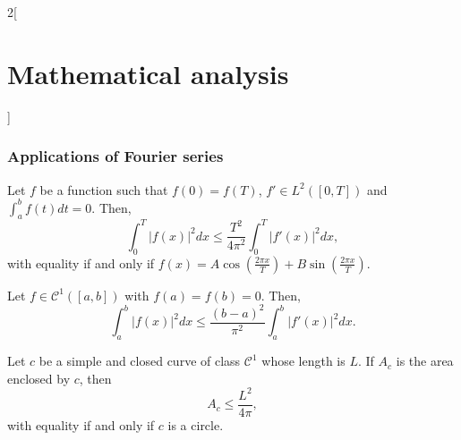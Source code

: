 \documentclass[class=article,crop=false]{standalone}
\begin{document}
\begin{multicols}{2}[\section{Mathematical analysis}]
\subsubsection{Applications of Fourier series}
\begin{theorem}
Let $f$ be a function such that $f(0)=f(T)$, $f'\in L^2([0,T])$ and $\displaystyle\int_a^bf(t)dt=0$. Then, $$\int_0^T|f(x)|^2dx\leq\frac{T^2}{4\pi^2}\int_0^T|f'(x)|^2dx,$$ with equality if and only if $\displaystyle f(x)=A\cos\left(\frac{2\pi x}{T}\right)+B\sin\left(\frac{2\pi x}{T}\right)$.
\end{theorem}
\begin{theorem}
Let $f\in \mathcal{C}^1([a,b])$ with $f(a)=f(b)=0$. Then, $$\int_a^b|f(x)|^2dx\leq\frac{(b-a)^2}{\pi^2}\int_a^b|f'(x)|^2dx.$$
\end{theorem}
\begin{theorem}
Let $c$ be a simple and closed curve of class $\mathcal{C}^1$ whose length is $L$. If $A_c$ is the area enclosed by $c$, then $$A_c\leq\frac{L^2}{4\pi},$$ with equality if and only if $c$ is a circle.
\end{theorem}
\end{multicols}
\end{document}
